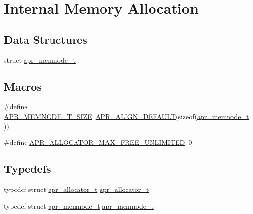 \hypertarget{group__apr__allocator}{}\section{Internal Memory Allocation}
\label{group__apr__allocator}
\subsection*{Data Structures}
\begin{DoxyCompactItemize}
\item 
struct \hyperlink{structapr__memnode__t}{apr\+\_\+memnode\+\_\+t}
\end{DoxyCompactItemize}
\subsection*{Macros}
\begin{DoxyCompactItemize}
\item 
\#define \hyperlink{group__apr__allocator_gaf382851817012929f4e2458b43f4482c}{A\+P\+R\+\_\+\+M\+E\+M\+N\+O\+D\+E\+\_\+\+T\+\_\+\+S\+I\+ZE}~\hyperlink{group__apr__general_gab484e98426221f3212fcb67af0467381}{A\+P\+R\+\_\+\+A\+L\+I\+G\+N\+\_\+\+D\+E\+F\+A\+U\+LT}(sizeof(\hyperlink{structapr__memnode__t}{apr\+\_\+memnode\+\_\+t}))
\item 
\#define \hyperlink{group__apr__allocator_ga54f32b19d8dad59bc6364a7a6b8ebec9}{A\+P\+R\+\_\+\+A\+L\+L\+O\+C\+A\+T\+O\+R\+\_\+\+M\+A\+X\+\_\+\+F\+R\+E\+E\+\_\+\+U\+N\+L\+I\+M\+I\+T\+ED}~0
\end{DoxyCompactItemize}
\subsection*{Typedefs}
\begin{DoxyCompactItemize}
\item 
typedef struct \hyperlink{group__apr__allocator_ga1ceabfd30fcfc455e47d052d2a24244b}{apr\+\_\+allocator\+\_\+t} \hyperlink{group__apr__allocator_ga1ceabfd30fcfc455e47d052d2a24244b}{apr\+\_\+allocator\+\_\+t}
\item 
typedef struct \hyperlink{structapr__memnode__t}{apr\+\_\+memnode\+\_\+t} \hyperlink{group__apr__allocator_ga3b6437036dfcdffbf87ad4677c818211}{apr\+\_\+memnode\+\_\+t}
\end{DoxyCompactItemize}
